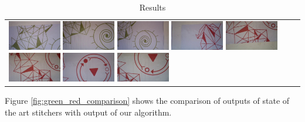 \begin{table}
\begin{tabular}{l|cc}
\includegraphics[width=0.19\textwidth]{figures/green_red/selected/3.jpg}
\includegraphics[width=0.19\textwidth]{figures/green_red/selected/4.jpg}
\includegraphics[width=0.19\textwidth]{figures/green_red/selected/5.jpg}
\includegraphics[width=0.19\textwidth]{figures/green_red/selected/6.jpg}
\includegraphics[width=0.19\textwidth]{figures/green_red/selected/7.jpg}
\includegraphics[width=0.19\textwidth]{figures/green_red/selected/8.jpg}
\includegraphics[width=0.19\textwidth]{figures/green_red/selected/9.jpg}
\includegraphics[width=0.19\textwidth]{figures/green_red/selected/10.jpg}
 \\       
\end{tabular}
\caption{Results}
\end{table}

Figure \ref{fig:green_red_comparison} shows the comparison of outputs of
state of the art stitchers with output of our algorithm.